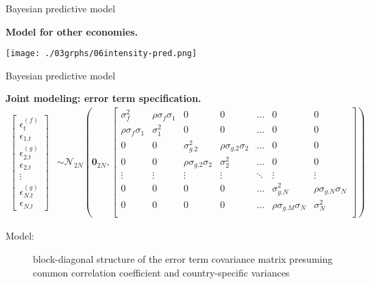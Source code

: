 \documentclass[notes,blackandwhite,mathsans,usenames,dvipsnames]{beamer}
\begin{document}
\begin{frame}{Bayesian  predictive model}

\textbf{Model for other economies.}
\begin{center}
\texttt{[image: ./03grphs/06intensity-pred.png]}
\end{center}
\end{frame}




\begin{frame}{Bayesian  predictive model}

\textbf{Joint modeling: error term specification.}\footnotesize
\begin{align*}
\begin{bmatrix} \epsilon_{t}^{(f)} \\ \epsilon_{1.t} \\ \epsilon_{2.t}^{(g)} \\ \epsilon_{2.t} \\  \vdots \\ \epsilon_{N.t}^{(g)} \\ \epsilon_{N.t} \end{bmatrix} &\sim\mathcal{N}_{2N}\left( \mathbf{0}_{2N}, 
\begin{bmatrix}
\sigma_f^2 & \rho\sigma_f\sigma_1 &0&0&\dots&0&0\\
\rho\sigma_f\sigma_1  & \sigma_1^2 &0&0&\dots&0&0\\
0&0 &\sigma_{g.2}^2 & \rho\sigma_{g.2}\sigma_2&\dots&0&0\\
0&0 & \rho\sigma_{g.2}\sigma_2 & \sigma_2^2&\dots&0&0\\
\vdots&\vdots & \vdots & \vdots&\ddots&\vdots&\vdots\\
0&0 &0&0&\dots&\sigma_{g.N}^2 & \rho\sigma_{g.N}\sigma_N\\
0&0 & 0&0&\dots&\rho\sigma_{g.M}\sigma_N & \sigma_N^2\\
\end{bmatrix} \right)
\end{align*}

\smallskip\small\begin{description}
\item[Model:] block-diagonal structure of the error term covariance matrix presuming common correlation coefficient and country-specific variances
\end{description}

\end{frame}
\end{document}
